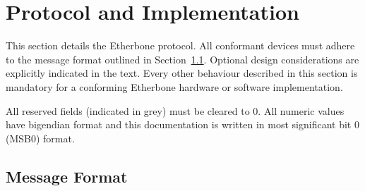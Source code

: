 \documentclass{article}
\begin{document}
\section{Protocol and Implementation}

This section details the Etherbone protocol.
All conformant devices must adhere to the message format outlined in
Section~\ref{sec:fmt}.
Optional design considerations are explicitly indicated in the text.
Every other behaviour described in this section is mandatory for a
conforming Etherbone hardware or software implementation.

All reserved fields (indicated in grey) must be cleared to 0.
All numeric values have bigendian format and 
this documentation is written in most significant bit 0 (MSB0) format.

\subsection{Message Format}
\label{sec:fmt}
\end{document}
